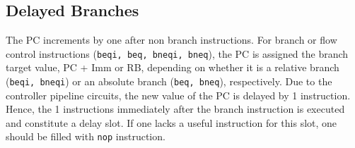 \subsection{Delayed Branches}

The PC increments by one after non branch instructions. For branch or
flow control instructions ({\tt beqi, beq, bneqi, bneq}), the PC is
assigned the branch target value, PC + Imm or RB, depending on whether
it is a relative branch ({\tt beqi, bneqi}) or an absolute branch
({\tt beq, bneq}), respectively. Due to the controller pipeline
circuits, the new value of the PC is delayed by 1 instruction. Hence,
the 1 instructions immediately after the branch instruction is
executed and constitute a delay slot. If one lacks a useful
instruction for this slot, one should be filled with {\tt nop}
instruction.

